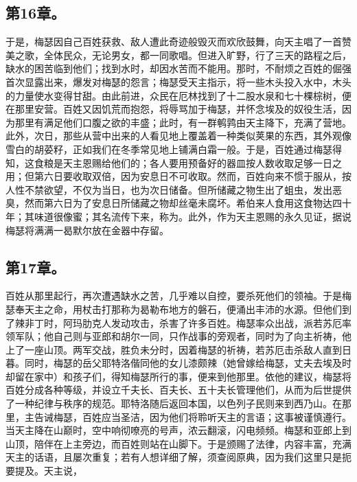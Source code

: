 
\subsection{第16章。}

于是，梅瑟因自己百姓获救、敌人遭此奇迹般毁灭而欢欣鼓舞，向天主唱了一首赞美之歌，全体民众，无论男女，都一同歌唱。但进入旷野，行了三天的路程之后，缺水的困苦临到他们；找到水时，却因水苦而不能用。那时，不耐烦之百姓的倔强首次显露出来，爆发对梅瑟的怨言；梅瑟受天主指示，将一些木头投入水中，木头的力量使水变得甘甜。由此前进，众民在厄林找到了十二股水泉和七十棵棕树，便在那里安营。百姓又因饥荒而抱怨，将辱骂加于梅瑟，并怀念埃及的奴役生活，因为那里有满足他们口腹之欲的丰盛；此时，有一群鹌鹑由天主降下，充满了营地。此外，次日，那些从营中出来的人看见地上覆盖着一种类似荚果的东西，其外观像雪白的胡荽籽，正如我们在冬季常见地上铺满白霜一般。于是，百姓通过梅瑟得知，这食粮是天主恩赐给他们的；各人要用预备好的器皿按人数收取足够一日之用；但第六日要收取双倍，因为安息日不可收取。然而，百姓向来不惯于服从，按人性不禁欲望，不仅为当日，也为次日储备。但所储藏之物生出了蛆虫，发出恶臭，然而第六日为了安息日所储藏之物却丝毫未腐坏。希伯来人食用这食物达四十年；其味道很像蜜；其名流传下来，称为。此外，作为天主恩赐的永久见证，据说梅瑟将满满一曷默尔放在金器中存留。\par


\subsection{第17章。}

百姓从那里起行，再次遭遇缺水之苦，几乎难以自控，要杀死他们的领袖。于是梅瑟奉天主之命，用杖击打那称为曷勒布地方的磐石，便涌出丰沛的水源。但他们到了辣非丁时，阿玛肋克人发动攻击，杀害了许多百姓。梅瑟率众出战，派若苏厄率领军队；他自己则与亚郎和胡尔一同，只作战事的旁观者，同时为了向主祈祷，他上了一座山顶。两军交战，胜负未分时，因着梅瑟的祈祷，若苏厄击杀敌人直到日暮。同时，梅瑟的岳父耶特洛偕同他的女儿漆颇辣（她曾嫁给梅瑟，丈夫去埃及时却留在家中）和孩子们，得知梅瑟所行的事，便来到他那里。依他的建议，梅瑟将百姓分成各种等级，并设立千夫长、百夫长、五十夫长管理他们，从而为后世提供了一种纪律与秩序的规范。耶特洛随后返回本国，以色列子民则来到西乃山。在那里，主告诫梅瑟，百姓应当圣洁，因为他们将聆听天主的言语；这事被谨慎遵行。当天主降在山巅时，空中响彻嘹亮的号声，浓云翻滚，闪电频频。梅瑟和亚郎上到山顶，陪伴在上主旁边，而百姓则站在山脚下。于是颁赐了法律，内容丰富，充满天主的话语，且屡次重复；若有人想详细了解，须查阅原典，因为我们这里只是扼要提及。天主说，\par

